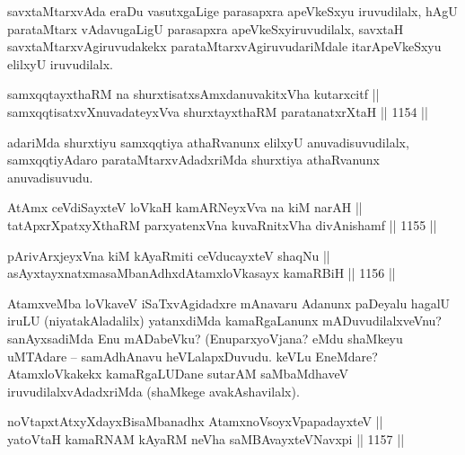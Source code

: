 \begin{artha}
savxtaMtarxvAda eraDu vasutxgaLige parasapxra apeVkeSxyu iruvudilalx, hAgU parataMtarx vAdavugaLigU parasapxra apeVkeSxyiruvudilalx, savxtaH savxtaMtarxvAgiruvudakekx parataMtarxvAgiruvudariMdale itarApeVkeSxyu elilxyU iruvudilalx.
\end{artha}

\begin{shl}
samxqqtayxthaRM na shurxtisatxsAmxdanuvakitxVha kutarxcitf ||  \\
samxqqtisatxvXnuvadateyxVva shurxtayxthaRM paratanatxrXtaH ||  1154 ||  
\end{shl}

\begin{artha}
adariMda shurxtiyu samxqqtiya athaRvanunx elilxyU anuvadisuvudilalx, samxqqtiyAdaro parataMtarxvAdadxriMda shurxtiya athaRvanunx anuvadisuvudu.
\end{artha}



\begin{shl}
AtAmx ceVdiSayxteV loVkaH kamARNeyxVva na kiM narAH || \\
tatApxrXpatxyXthaRM parxyatenxVna kuvaRnitxVha divAnishamf ||  1155 ||  
\end{shl}
				
\begin{shl}
pArivArxjeyxVna kiM kAyaRmiti ceVducayxteV shaqNu || \\
asAyxtayxnatxmasaMbanAdhxdAtamxloVkasayx kamaRBiH ||  1156 ||  
\end{shl}

\begin{artha}
AtamxveMba loVkaveV iSaTxvAgidadxre mAnavaru Adanunx paDeyalu hagalU iruLU (niyatakAladalilx) yatanxdiMda kamaRgaLanunx mADuvudilalxveVnu? sanAyxsadiMda Enu mADabeVku? (EnuparxyoVjana? eMdu shaMkeyu uMTAdare -- samAdhAnavu heVLalapxDuvudu. keVLu EneMdare? AtamxloVkakekx kamaRgaLUDane sutarAM saMbaMdhaveV iruvudilalxvAdadxriMda (shaMkege avakAshavilalx).
\end{artha}


\begin{shl}
noVtapxtAtxyXdayxBisaMbanadhx AtamxnoV\s soyxVpapadayxteV || \\
yatoV\s taH kamaRNAM kAyaRM neVha saMBAvayxteV\s Navxpi ||  1157 ||  
\end{shl}
				
